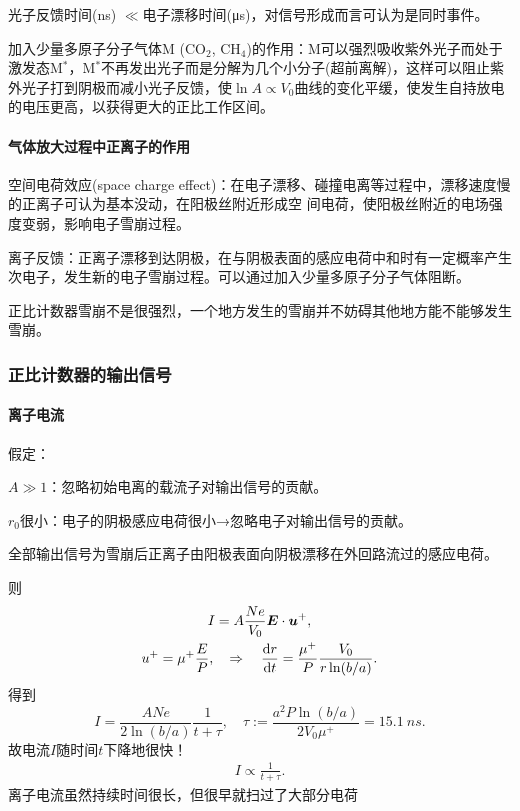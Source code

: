\begin{compactitem}
	\item 光子反馈时间(\si{ns}) $\ll$电子漂移时间(\si{\micro s})，对信号形成而言可认为是同时事件。
	\item 加入少量多原子分子气体M (CO$_2$, CH$_4$)的作用：M可以强烈吸收紫外光子而处于激发态M$^*$，M$^\ast$不再发出光子而是分解为几个小分子(超前离解)，这样可以阻止紫外光子打到阴极而减小光子反馈，使$\ln A\propto V_0$曲线的变化平缓，使发生自持放电的电压更高，以获得更大的正比工作区间。
\end{compactitem}
\paragraph{气体放大过程中正离子的作用}
空间电荷效应(space charge effect)：在电子漂移、碰撞电离等过程中，漂移速度慢的正离子可认为基本没动，在阳极丝附近形成空
间电荷，使阳极丝附近的电场强度变弱，影响电子雪崩过程。%

离子反馈：正离子漂移到达阴极，在与阴极表面的感应电荷中和时有一定概率产生次电子，发生新的电子雪崩过程。可以通过加入少量多原子分子气体阻断。

正比计数器雪崩不是很强烈，一个地方发生的雪崩并不妨碍其他地方能不能够发生雪崩。
\subsubsection{正比计数器的输出信号}
\paragraph{离子电流}假定：
\begin{compactenum}
	\item $A\gg 1$：忽略初始电离的载流子对输出信号的贡献。
	\item $r_0$很小：电子的阴极感应电荷很小→忽略电子对输出信号的贡献。
	\item 全部输出信号为雪崩后正离子由阳极表面向阴极漂移在外回路流过的感应电荷。
\end{compactenum}
则
\begin{gather*}
	I=A\frac{Ne}{V_0}\bm E\cdot\bm u^+,\\
	u^+=\mu^+\frac EP,\quad\Rightarrow\quad\frac{\mathrm{d}^{\;\!\!}r}{\mathrm{d} t^{\;\!\!}}=\frac{\mu^+}P\frac{V_0}{r\ln(b/a)}.
\end{gather*}
得到
\[
	I=\frac{ANe}{2\ln(b/a)}\frac1{t+\tau},\quad\tau:=\frac{a^2P\ln(b/a)}{2V_0\mu^+}=\SI{15.1}{ns}.
\]
故电流$I$随时间$t$下降地很快！
\begin{align}
	I\propto\frac1{t+\tau}.
\end{align}
离子电流虽然持续时间很长，但很早就扫过了大部分电荷

